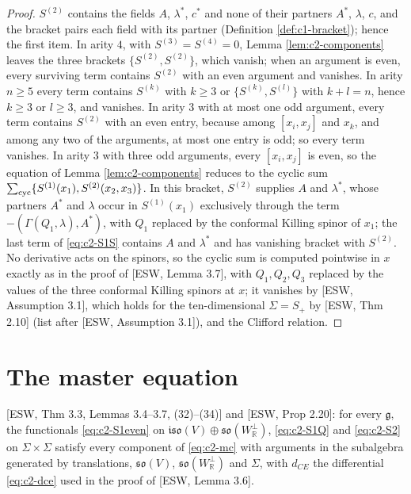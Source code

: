 \begin{proof}
$S^{(2)}$ contains the fields $A$, $\lambda^*$, $c^*$ and none of their partners $A^*$, $\lambda$, $c$, and the bracket pairs each field with its partner (Definition \ref{def:c1-bracket}); hence the first item. In arity $4$, with $S^{(3)}=S^{(4)}=0$, Lemma \ref{lem:c2-components} leaves the three brackets $\{S^{(2)},S^{(2)}\}$, which vanish; when an argument is even, every surviving term contains $S^{(2)}$ with an even argument and vanishes. In arity $n\ge5$ every term contains $S^{(k)}$ with $k\ge3$ or $\{S^{(k)},S^{(l)}\}$ with $k+l=n$, hence $k\ge3$ or $l\ge3$, and vanishes. In arity $3$ with at most one odd argument, every term contains $S^{(2)}$ with an even entry, because among $[x_i,x_j]$ and $x_k$, and among any two of the arguments, at most one entry is odd; so every term vanishes. In arity $3$ with three odd arguments, every $[x_i,x_j]$ is even, so the equation of Lemma \ref{lem:c2-components} reduces to the cyclic sum $\sum_{\rm cyc}\{S^{(1)}(x_1),S^{(2)}(x_2,x_3)\}$. In this bracket, $S^{(2)}$ supplies $A$ and $\lambda^*$, whose partners $A^*$ and $\lambda$ occur in $S^{(1)}(x_1)$ exclusively through the term $-(\Gamma(Q_1,\lambda),A^*)$, with $Q_1$ replaced by the conformal Killing spinor of $x_1$; the last term of \eqref{eq:c2-S1S} contains $A$ and $\lambda^*$ and has vanishing bracket with $S^{(2)}$. No derivative acts on the spinors, so the cyclic sum is computed pointwise in $x$ exactly as in the proof of [ESW, Lemma 3.7], with $Q_1,Q_2,Q_3$ replaced by the values of the three conformal Killing spinors at $x$; it vanishes by [ESW, Assumption 3.1], which holds for the ten-dimensional $\Sigma=S_+$ by [ESW, Thm 2.10] (list after [ESW, Assumption 3.1]), and the Clifford relation.
\end{proof}

\section{The master equation}

\begin{axiom}
\label{ax:c2-esw}
[ESW, Thm 3.3, Lemmas 3.4--3.7, (32)--(34)] and [ESW, Prop 2.20]: for every $\mathfrak g$, the functionals \eqref{eq:c2-S1even} on $\mathfrak{iso}(V)\oplus\mathfrak{so}(W_{\mathbb R}^\perp)$, \eqref{eq:c2-S1Q} and \eqref{eq:c2-S2} on $\Sigma\times\Sigma$ satisfy every component of \eqref{eq:c2-mc} with arguments in the subalgebra generated by translations, $\mathfrak{so}(V)$, $\mathfrak{so}(W_{\mathbb R}^\perp)$ and $\Sigma$, with $d_{CE}$ the differential \eqref{eq:c2-dce} used in the proof of [ESW, Lemma 3.6].
\end{axiom}

